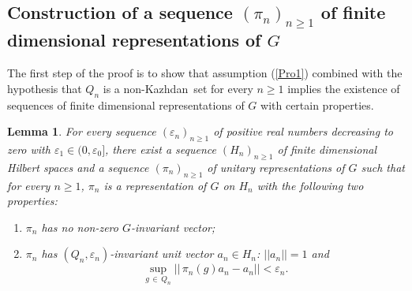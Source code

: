 \documentclass[11pt,english,a4paper]{smfart}
\numberwithin{equation}{section}
\newtheorem{lemma}[theorem]{Lemma}
\theoremstyle{definition}
\begin{document}
\subsection{Construction of a sequence $(\pi _{n})_{n\ge 1}$ of 
finite dimensional representations of $G$}\label{Section 5.2}
The first step of the proof is to show that assumption (\ref{Pro1}) 
combined with the 
hypothesis that ${Q_{n}}$ is a non-{Kazhdan}\ set for every ${n\ge 1}$ implies the 
existence of sequences of finite dimensional representations of $G$ with 
certain properties.
\begin{lemma}\label{Lemma 6.1}
For every sequence $(\varepsilon _{n})_{n\ge 1}$ of positive real numbers 
decreasing to zero with  $\varepsilon _{1}\in(0,\varepsilon _{0}]$, 
there exist a sequence $(H_{n})_{n\ge 1}$ of finite dimensional Hilbert 
spaces and a sequence $(\pi_{n})_{n\ge 1}$ of unitary representations of $G$ such that for every $n\ge 1$, $\pi _{n}$ is a representation of $G$ on ${H_{n}} $ with the following two properties:
\begin{enumerate}
 \item [--] $\pi _{n}$ has no non-zero $G$-invariant vector;
 \item[--] $\pi _{n}$ has  $({Q_{n}},{\varepsilon _{n}})$-invariant unit vector 
${a_{n}}\in H_{n}$: $||{a_{n}}||=1$ and 
\[
\sup_{g\,\in\,{Q_{n}}}
||\,\pi _{n}(g){a_{n}}-{a_{n}}||<{\varepsilon _{n}}.
\]
\end{enumerate}
\end{lemma}
\end{document}
